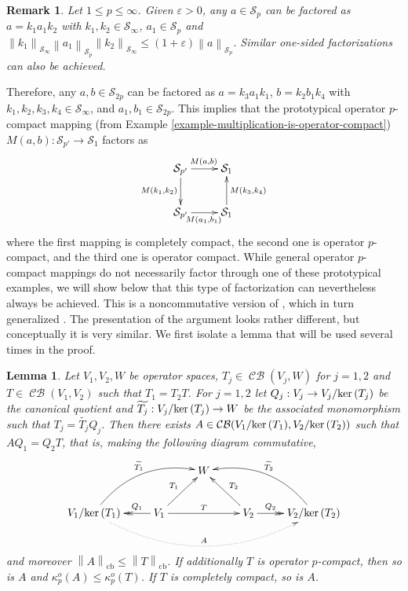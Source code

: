 \documentclass[11pt]{amsart}
\DeclareMathOperator{\cb}{cb}
\DeclareMathOperator{\CB}{\mathcal{CB}}
\newcommand{\n}[1]{ \left\|#1\right\| }
\newtheorem{lemma}[theorem]{Lemma}
\newtheorem{remark}[theorem]{Remark}
\numberwithin{equation}{section}
\def\ker{{\rm ker\, }}
\begin{document}
\begin{remark}\label{remark-trick}
Let $1 \le p \le \infty$. Given $\varepsilon>0$, any  $a \in \mathcal{S}_{p}$ can be factored as $a = k_1a_1k_2$ with $k_1, k_2 \in \mathcal{S}_{\infty}$, $a_1 \in \mathcal{S}_{p}$ and $\n{k_1}_{\mathcal{S}_{\infty}} \n{a_1}_{\mathcal{S}_{p}} \n{k_2}_{\mathcal{S}_{\infty}} \le (1+\varepsilon)\n{a}_{\mathcal{S}_{p}}$.
Similar one-sided factorizations can also be achieved.
\end{remark}


Therefore, any $a,b \in \mathcal{S}_{2p}$ can be factored as $a = k_3a_1k_1$, $b = k_2b_1k_4$ with $k_1,k_2,k_3,k_4 \in \mathcal{S}_\infty$, and $a_1,b_1 \in \mathcal{S}_{2p}$. This implies that the prototypical operator $p$-compact mapping (from Example \ref{example-multiplication-is-operator-compact}) $M(a,b) : \mathcal{S}_{p'} \to \mathcal{S}_1$ factors as
$$
\xymatrix{
\mathcal{S}_{p'} \ar[r]^{M(a,b)} \ar[d]_{M(k_1,k_2)} &\mathcal{S}_1 \\
\mathcal{S}_{p'} \ar[r]_{M(a_1,b_1)} &\mathcal{S}_1 \ar[u]_{M(k_3,k_4)}
}
$$
where the first mapping is completely compact, the second one is operator $p$-compact, and the third one is operator compact. While general operator $p$-compact mappings do not necessarily factor through one of these prototypical examples, we will  show below that this type of factorization can nevertheless always
be achieved. This is a noncommutative version of \cite[Prop. 2.9]{Galicer-Lassalle-Turco}, which in turn generalized \cite[Thm. 3.1]{Choi-Kim}. The presentation of the argument looks rather different, but conceptually it is very similar. We first isolate a lemma that will be used several times in the proof.

\begin{lemma}\label{lemma-factorization-linear-algebra}
Let $V_1,V_2,W$ be operator spaces, $T_j \in \CB(V_j,W)$ for $j=1,2$ and $T \in \CB(V_1,V_2)$ such that $T_1 = T_2T$. For $j=1,2$ let $Q_j : V_j \to V_j/\ker(T_j)$ be the canonical quotient and $\widetilde{T_j} : V_j/\ker(T_j) \to W$ be the associated monomorphism such that $T_j = \widetilde{T_j}Q_j$.
Then there exists $A \in \CB(V_1/\ker(T_1), V_2/\ker(T_2))$ such that $A Q_1 = Q_2 T$, that is, making the following diagram commutative,
\[
\xymatrix{
& & W &\\ 
V_1/\ker(T_1) \ar@{.>}@/_2.5pc/[rrrr]^{A} \ar@/^1.5pc/[urr]^{\widetilde{T_1}}  &V_1 \ar[ur]^{T_1} \ar@{->>}[l]_>>>>>{Q_1} \ar[rr]^T & &V_2\ar[ul]_{T_2} \ar@{->>}[r]^>>>>>{Q_2} &V_2/\ker(T_2) \ar@/_1.5pc/[ull]_{\widetilde{T_2}}\\
}
\]
and moreover $\n{A}_{\cb} \le \n{T}_{\cb}$.
If additionally $T$ is operator $p$-compact, then so is $A$ and $\kappa_p^o(A) \le \kappa_p^o(T)$.
If $T$ is completely compact, so is $A$.
\end{lemma}
\end{document}
